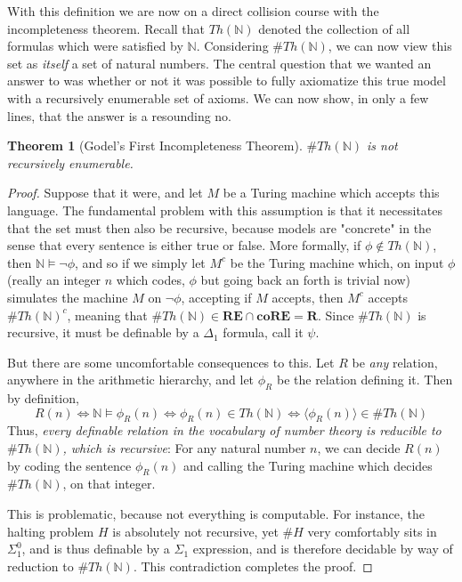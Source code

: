 \documentclass{article}
\theoremstyle{definition}
\theoremstyle{plain}
\theoremstyle{theorem}
\newtheorem{theorem}{Theorem}[section]
\begin{document}
 With this definition we are now on a direct collision course with the incompleteness theorem. Recall that $Th(\mathbb{N})$ denoted the collection of all formulas which were satisfied by $\mathbb{N}$. Considering $\#Th(\mathbb{N})$, we can now view this set as \textit{itself} a set of natural numbers. The central question that we wanted an answer to was whether or not it was possible to fully axiomatize this true model with a recursively enumerable set of axioms. We can now show, in only a few lines, that the answer is a resounding no.
\begin{theorem}[Godel's First Incompleteness Theorem]
    $\#Th(\mathbb{N})$ is not recursively enumerable. 
\end{theorem}
\begin{proof}
    Suppose that it were, and let $M$ be a Turing machine which accepts this language. The fundamental problem with this assumption is that it necessitates that the set must then also be recursive, because models are "concrete" in the sense that every sentence is either true or false. More formally, if $\phi \notin Th(\mathbb{N})$, then $\mathbb{N} \models \neg \phi$, and so if we simply let $M^c$ be the Turing machine which, on input $\phi$ (really an integer $n$ which codes, $\phi$ but going back an forth is trivial now) simulates the machine $M$ on $\neg \phi$, accepting if $M$ accepts, then $M^c$ accepts $\#Th(\mathbb{N})^c$, meaning that $\#Th(\mathbb{N}) \in \textbf{RE} \cap \textbf{coRE} = \textbf{R}$. Since $\#Th(\mathbb{N})$ is recursive, it must be definable by a $\Delta_1$ formula, call it $\psi$.
    \par But there are some uncomfortable consequences to this. Let $R$ be \textit{any} relation, anywhere in the arithmetic hierarchy, and let $\phi_R$ be the relation defining it. Then by definition, \[ R(n) \iff \mathbb{N} \models \phi_R(n) \iff \phi_R(n) \in Th(\mathbb{N}) \iff \langle \phi_R(n) \rangle \in \#Th(\mathbb{N}) \]
    Thus, \textit{every definable relation in the vocabulary of number theory is reducible to $\#Th(\mathbb{N})$, which is recursive}: For any natural number $n$, we can decide $R(n)$ by coding the sentence $\phi_R(n)$ and calling the Turing machine which decides $\#Th(\mathbb{N})$, on that integer.
    \par This is problematic, because not everything is computable. For instance, the halting problem $H$ is absolutely not recursive, yet $\#H$ very comfortably sits in $\Sigma^0_1$, and is thus definable by a $\Sigma_1$ expression, and is therefore decidable by way of reduction to $\#Th(\mathbb{N})$. This contradiction completes the proof.
\end{proof}
\end{document}
